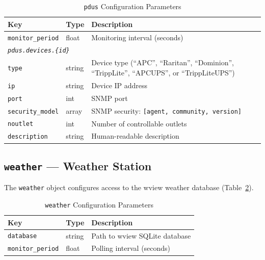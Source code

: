 \begin{table}[htbp]
    \centering
    \caption{\texttt{pdus} Configuration Parameters}
    \label{tab:config-pdus}
    \begin{tabular}{llp{7cm}}
        \toprule
        \textbf{Key} & \textbf{Type} & \textbf{Description} \\
        \midrule
        \texttt{monitor\_period} & float & Monitoring interval (seconds) \\
        \midrule
        \multicolumn{3}{l}{\textit{\texttt{pdus.devices.\{id\}}}} \\
        \quad\texttt{type}           & string & Device type (``APC'', ``Raritan'', ``Dominion'', ``TrippLite'', ``APCUPS'', or ``TrippLiteUPS'') \\
        \quad\texttt{ip}             & string & Device IP address \\
        \quad\texttt{port}           & int    & SNMP port \\
        \quad\texttt{security\_model} & array & SNMP security: \texttt{[agent, community, version]} \\
        \quad\texttt{noutlet}        & int    & Number of controllable outlets \\
        \quad\texttt{description}    & string & Human-readable description \\
        \bottomrule
    \end{tabular}
\end{table}

\subsection{\texttt{weather} --- Weather Station}

The \texttt{weather} object configures access to the wview weather database (Table~\ref{tab:config-weather}).

\begin{table}[htbp]
    \centering
    \caption{\texttt{weather} Configuration Parameters}
    \label{tab:config-weather}
    \begin{tabular}{llp{7cm}}
        \toprule
        \textbf{Key} & \textbf{Type} & \textbf{Description} \\
        \midrule
        \texttt{database}       & string & Path to wview SQLite database \\
        \texttt{monitor\_period} & float & Polling interval (seconds) \\
        \bottomrule
    \end{tabular}
\end{table}

